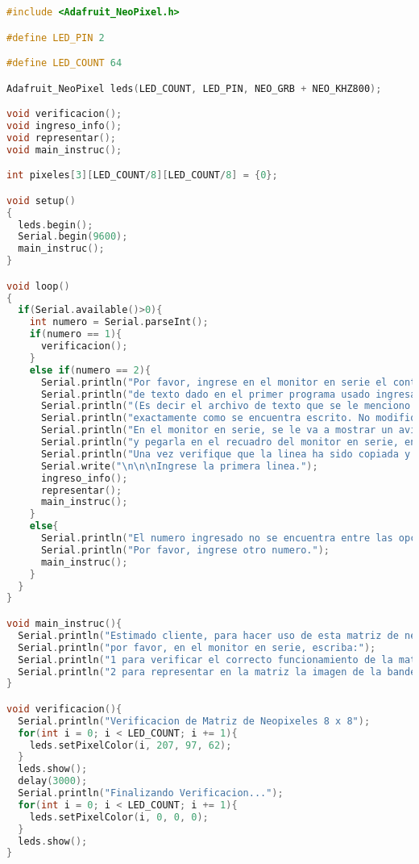 \documentclass{article}
\begin{document}
\begin{lstlisting}[language=C++, label=error_electronica]
#include <Adafruit_NeoPixel.h>

#define LED_PIN 2

#define LED_COUNT 64

Adafruit_NeoPixel leds(LED_COUNT, LED_PIN, NEO_GRB + NEO_KHZ800);

void verificacion();
void ingreso_info();
void representar();
void main_instruc();

int pixeles[3][LED_COUNT/8][LED_COUNT/8] = {0};

void setup()
{
  leds.begin();
  Serial.begin(9600);
  main_instruc();
}

void loop()
{
  if(Serial.available()>0){
    int numero = Serial.parseInt();
    if(numero == 1){
      verificacion();
    }
    else if(numero == 2){
      Serial.println("Por favor, ingrese en el monitor en serie el contenido del archivo");
      Serial.println("de texto dado en el primer programa usado ingresando linea por linea,");
      Serial.println("(Es decir el archivo de texto que se le menciono mantener abierto para este segundo programa");
      Serial.println("exactamente como se encuentra escrito. No modifique nada del contenido.");
      Serial.println("En el monitor en serie, se le va a mostrar un aviso para poder copiar 1 linea");
      Serial.println("y pegarla en el recuadro del monitor en serie, en su parte inferior, habilitado para pegar dicha linea.");
      Serial.println("Una vez verifique que la linea ha sido copiada y pegada correctamente, oprima enter para ingresarla.");
      Serial.write("\n\n\nIngrese la primera linea.");
      ingreso_info();
      representar();
      main_instruc();
    }
    else{
      Serial.println("El numero ingresado no se encuentra entre las opciones dadas.");
      Serial.println("Por favor, ingrese otro numero.");
      main_instruc();
    }
  }
}

void main_instruc(){
  Serial.println("Estimado cliente, para hacer uso de esta matriz de neopixeles,");
  Serial.println("por favor, en el monitor en serie, escriba:");
  Serial.println("1 para verificar el correcto funcionamiento de la matriz");
  Serial.println("2 para representar en la matriz la imagen de la bandera escogida en el anterior programa");
}

void verificacion(){
  Serial.println("Verificacion de Matriz de Neopixeles 8 x 8");
  for(int i = 0; i < LED_COUNT; i += 1){
    leds.setPixelColor(i, 207, 97, 62);
  }
  leds.show();
  delay(3000);
  Serial.println("Finalizando Verificacion...");
  for(int i = 0; i < LED_COUNT; i += 1){
    leds.setPixelColor(i, 0, 0, 0);
  }
  leds.show();
}


\end{lstlisting}
\end{document}
